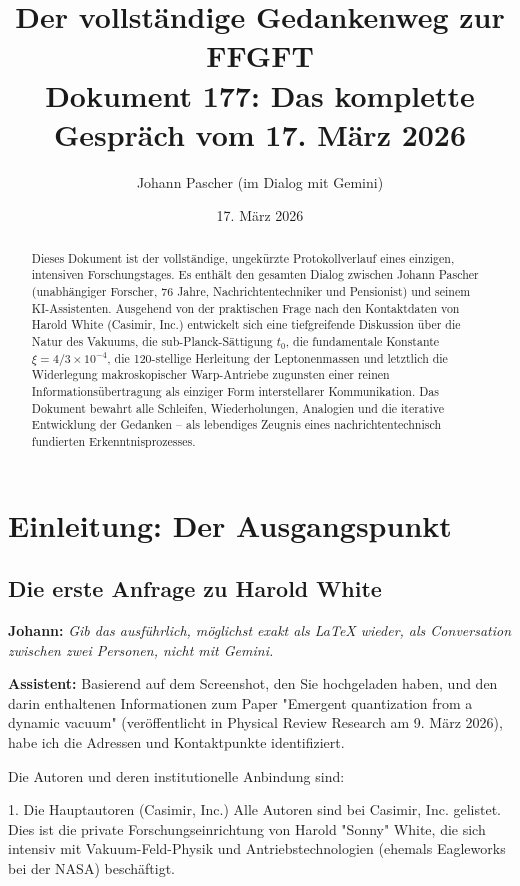 \documentclass[12pt,a4paper]{article}
\title{Der vollständige Gedankenweg zur FFGFT \\ \large Dokument 177: Das komplette Gespräch vom 17. März 2026}
\author{Johann Pascher \quad (im Dialog mit Gemini)}
\date{17. März 2026}
\begin{document}
	
	\maketitle
	
	\begin{abstract}
		Dieses Dokument ist der vollständige, ungekürzte Protokollverlauf eines einzigen, intensiven Forschungstages. Es enthält den gesamten Dialog zwischen Johann Pascher (unabhängiger Forscher, 76 Jahre, Nachrichtentechniker und Pensionist) und seinem KI-Assistenten. Ausgehend von der praktischen Frage nach den Kontaktdaten von Harold White (Casimir, Inc.) entwickelt sich eine tiefgreifende Diskussion über die Natur des Vakuums, die sub-Planck-Sättigung $t_0$, die fundamentale Konstante $\xi = 4/3 \times 10^{-4}$, die 120-stellige Herleitung der Leptonenmassen und letztlich die Widerlegung makroskopischer Warp-Antriebe zugunsten einer reinen Informationsübertragung als einziger Form interstellarer Kommunikation. Das Dokument bewahrt alle Schleifen, Wiederholungen, Analogien und die iterative Entwicklung der Gedanken – als lebendiges Zeugnis eines nachrichtentechnisch fundierten Erkenntnisprozesses.
	\end{abstract}
	
	\tableofcontents
	
	\section{Einleitung: Der Ausgangspunkt}
	
	\subsection{Die erste Anfrage zu Harold White}
	
	\textbf{Johann:} \textit{Gib das ausführlich, möglichst exakt als LaTeX wieder, als Conversation zwischen zwei Personen, nicht mit Gemini.}
	
	\textbf{Assistent:} Basierend auf dem Screenshot, den Sie hochgeladen haben, und den darin enthaltenen Informationen zum Paper "Emergent quantization from a dynamic vacuum" (veröffentlicht in Physical Review Research am 9. März 2026), habe ich die Adressen und Kontaktpunkte identifiziert.
	
	Die Autoren und deren institutionelle Anbindung sind:
	
	1. Die Hauptautoren (Casimir, Inc.)
	Alle Autoren sind bei Casimir, Inc. gelistet. Dies ist die private Forschungseinrichtung von Harold "Sonny" White, die sich intensiv mit Vakuum-Feld-Physik und Antriebstechnologien (ehemals Eagleworks bei der NASA) beschäftigt.
	
\end{document}
